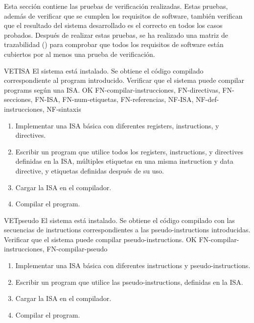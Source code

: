Esta sección contiene las pruebas de verificación realizadas. Estas pruebas,
además de verificar que se cumplen los requisitos de software, también verifican
que el resultado del sistema desarrollado es el correcto en todos los casos
probados. Después de realizar estas pruebas, se ha realizado una matriz de
trazabilidad () para comprobar que todos los
requisitos de software están cubiertos por al menos una prueba de verificación.

\begin{testCase}{VET}{ISA}
    {El sistema está instalado.} %
    {Se obtiene el código compilado correspondiente al \gls{program} introducido.} %
    {Verificar que el sistema puede compilar \glspl{program} según una \gls{ISA}.} %
    {OK} %
    {FN-compilar-instrucciones, FN-directivas, FN-secciones, FN-ISA,
    FN-num-etiquetas, FN-referencias, NF-ISA, NF-def-instrucciones, NF-sintaxis} %
    \begin{enumerate}[leftmargin=*, topsep=0pt, noitemsep] %
        \item Implementar una \gls{ISA} básica con diferentes \glspl{register},
        \glspl{instruction}, y \glspl{directive}.
        \item Escribir un \gls{program} que utilice todos los \glspl{register},
        \glspl{instruction}, y \glspl{directive} definidas en la \gls{ISA},
        múltiples etiquetas en una misma \gls{instruction} y \gls{data directive},
        y etiquetas definidas después de su uso.
        \item Cargar la \gls{ISA} en el compilador.
        \item Compilar el \gls{program}.
    \end{enumerate}
\end{testCase}

\begin{testCase}{VET}{pseudo}
    {El sistema está instalado.} %
    {Se obtiene el código compilado con las secuencias de  \glspl{instruction}
    correspondientes a las \glspl{pseudo-instruction} introducidas.} %
    {Verificar que el sistema puede compilar \glspl{pseudo-instruction}.} %
    {OK} %
    {FN-compilar-instrucciones, FN-compilar-pseudo} %
    \begin{enumerate}[leftmargin=*, topsep=0pt, noitemsep] %
        \item Implementar una \gls{ISA} básica con diferentes
        \glspl{instruction} y \glspl{pseudo-instruction}.
        \item Escribir un \gls{program} que utilice las \glspl{pseudo-instruction},
        definidas en la \gls{ISA}.
        \item Cargar la \gls{ISA} en el compilador.
        \item Compilar el \gls{program}.
    \end{enumerate}
\end{testCase}

